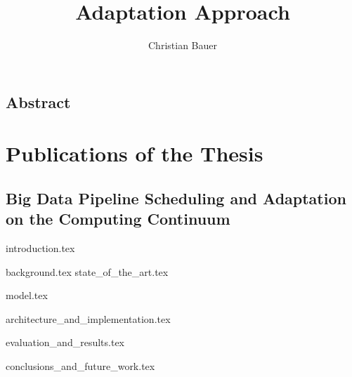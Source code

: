\documentclass{memoir}
\title{Adaptation Approach}
\author{Christian Bauer}
\begin{document}
  \maketitle

  \tableofcontents
  \listoffigures
  

  \section*{Abstract}

  \chapter*{Publications of the Thesis}

    \section*{Big Data Pipeline Scheduling and Adaptation on the Computing Continuum}

    
    

  {introduction.tex}

  {background.tex}
  {state_of_the_art.tex}

  {model.tex}

  {architecture_and_implementation.tex}
  
  {evaluation_and_results.tex}

  {conclusions_and_future_work.tex}



  
  
\end{document}
